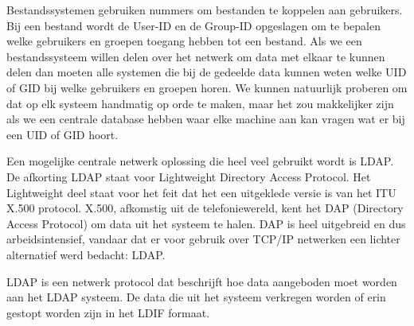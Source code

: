 Bestandssystemen gebruiken nummers om bestanden te koppelen aan gebruikers. Bij een bestand wordt de User-ID en de Group-ID opgeslagen om te bepalen welke gebruikers en groepen toegang hebben tot een bestand. Als we een bestandssysteem willen delen over het netwerk om data met elkaar te kunnen delen dan moeten alle systemen die bij de gedeelde data kunnen weten welke UID of GID bij welke gebruikers en groepen horen. We kunnen natuurlijk proberen om dat op elk systeem handmatig op orde te maken, maar het zou makkelijker zijn als we een centrale database hebben waar elke machine aan kan vragen wat er bij een UID of GID hoort.

Een mogelijke centrale netwerk oplossing die heel veel gebruikt wordt is LDAP. De afkorting LDAP staat voor Lightweight Directory Access Protocol. Het Lightweight deel staat voor het feit dat het een uitgeklede versie is van het ITU X.500 protocol. X.500, afkomstig uit de telefoniewereld, kent het DAP (Directory Access Protocol) om data uit het systeem te halen. DAP is heel uitgebreid en dus arbeidsintensief, vandaar dat er voor gebruik over TCP/IP netwerken een lichter alternatief werd bedacht: LDAP.

LDAP is een netwerk protocol dat beschrijft hoe data aangeboden moet worden aan het LDAP systeem. De data die uit het systeem verkregen worden of erin gestopt worden zijn in het LDIF formaat.

